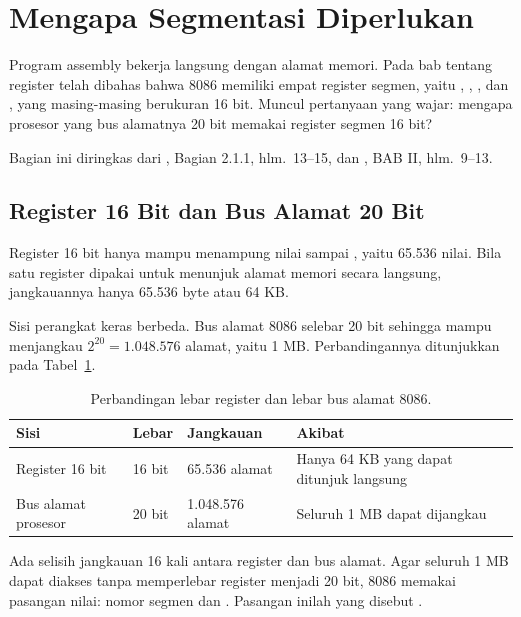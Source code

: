 \section{Mengapa Segmentasi Diperlukan}
\label{sec:masalah-segmentasi}

Program assembly bekerja langsung dengan alamat memori. Pada bab
tentang register telah dibahas bahwa 8086 memiliki empat register
segmen, yaitu , , , dan , yang
masing-masing berukuran 16 bit. Muncul pertanyaan yang wajar:
mengapa prosesor yang bus alamatnya 20 bit memakai register segmen
16 bit?

Bagian ini diringkas dari \cite{gunawan2019}, Bagian 2.1.1,
hlm.~13--15, dan \cite{sto2001}, BAB II, hlm.~9--13.

\subsection{Register 16 Bit dan Bus Alamat 20 Bit}

Register 16 bit hanya mampu menampung nilai  sampai
, yaitu 65.536 nilai. Bila satu register dipakai untuk
menunjuk alamat memori secara langsung, jangkauannya hanya 65.536
byte atau 64 KB.

Sisi perangkat keras berbeda. Bus alamat 8086 selebar 20 bit
sehingga mampu menjangkau $2^{20} = 1.048.576$ alamat, yaitu 1 MB.
Perbandingannya ditunjukkan pada Tabel~\ref{tab:lebar-alamat}.

\begin{table}[H]
    \centering
    \caption{Perbandingan lebar register dan lebar bus alamat 8086.}
    \label{tab:lebar-alamat}
    \small
    \begin{tabular}{@{}p{4.2cm}p{2.0cm}p{2.6cm}p{4.4cm}@{}}
        \toprule
        \textbf{Sisi} & \textbf{Lebar} & \textbf{Jangkauan} &
        \textbf{Akibat} \\
        \midrule
        Register 16 bit & 16 bit & 65.536 alamat &
        Hanya 64 KB yang dapat ditunjuk langsung \\
        \addlinespace
        Bus alamat prosesor & 20 bit & 1.048.576 alamat &
        Seluruh 1 MB dapat dijangkau \\
        \bottomrule
    \end{tabular}
\end{table}

Ada selisih jangkauan 16 kali antara register dan bus alamat. Agar
seluruh 1 MB dapat diakses tanpa memperlebar register menjadi 20 bit,
8086 memakai pasangan nilai: nomor segmen dan . Pasangan
inilah yang disebut .

